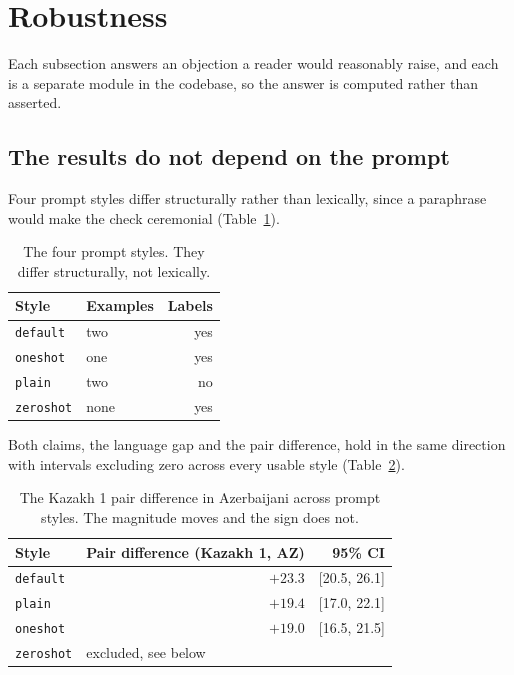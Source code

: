 \documentclass[final]{clv2025}
\begin{document}
\section{Robustness}

Each subsection answers an objection a reader would reasonably raise, and each
is a separate module in the codebase, so the answer is computed rather than
asserted.

\subsection{The results do not depend on the prompt}

Four prompt styles differ structurally rather than lexically, since a
paraphrase would make the check ceremonial (Table~\ref{tab:styles}).

\begin{table}[h!]
\caption{The four prompt styles. They differ structurally, not lexically.}
\label{tab:styles}
\centering
\begin{tabular}{llr}
\toprule
Style & Examples & Labels \\
\midrule
\texttt{default} & two & yes \\
\texttt{oneshot} & one & yes \\
\texttt{plain} & two & no \\
\texttt{zeroshot} & none & yes \\
\bottomrule
\end{tabular}
\end{table}

Both claims, the language gap and the pair difference, hold in the same
direction with intervals excluding zero across every usable style
(Table~\ref{tab:prompts}).

\begin{table}[h!]
\caption{The Kazakh 1 pair difference in Azerbaijani across prompt styles. The
magnitude moves and the sign does not.}
\label{tab:prompts}
\centering
\begin{tabular}{lrr}
\toprule
Style & Pair difference (Kazakh 1, AZ) & 95\% CI \\
\midrule
\texttt{default} & $+23.3$ & [20.5, 26.1] \\
\texttt{plain} & $+19.4$ & [17.0, 22.1] \\
\texttt{oneshot} & $+19.0$ & [16.5, 21.5] \\
\texttt{zeroshot} & \multicolumn{2}{l}{excluded, see below} \\
\bottomrule
\end{tabular}
\end{table}
\end{document}

